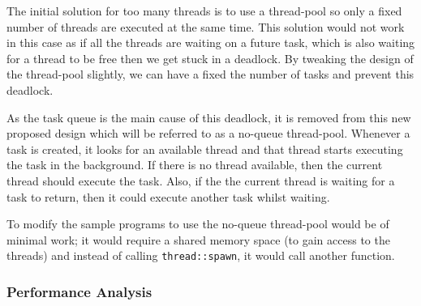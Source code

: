 \documentclass[conference]{IEEEtran}
\begin{document}
The initial solution for too many threads is to use a thread-pool so only a fixed number of threads are executed at the same time. This solution would not work in this case as if all the threads are waiting on a future task, which is also waiting for a thread to be free then we get stuck in a deadlock. By tweaking the design of the thread-pool slightly, we can have a fixed the number of tasks and prevent this deadlock.

As the task queue is the main cause of this deadlock, it is removed from this new proposed design which will be referred to as a no-queue thread-pool. Whenever a task is created, it looks for an available thread and that thread starts executing the task in the background. If there is no thread available, then the current thread should execute the task. Also, if the the current thread is waiting for a task to return, then it could execute another task whilst waiting.  

To modify the sample programs to use the no-queue thread-pool would be of minimal work; it would require a shared memory space (to gain access to the threads) and instead of calling \texttt{thread::spawn}, it would call another function.

\subsubsection{Performance Analysis}

\printbibliography
\end{document}
